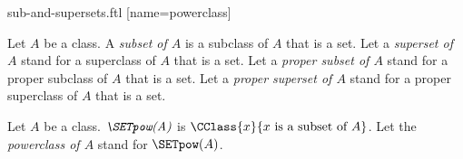\documentclass{stex}
\begin{document}
\begin{smodule}{sub-and-supersets.ftl}
[name=powerclass]{}

\begin{definition}[forthel,for={subset,superset,proper subset,proper superset}]
  Let $A$ be a class.
  A \emph{subset of $A$} is a subclass of $A$ that is a set.
  Let a \emph{superset of $A$} stand for a superclass of $A$ that is a set.
  Let a \emph{proper subset of $A$} stand for a proper subclass of $A$ that is a set.
  Let a \emph{proper superset of $A$} stand for a proper superclass of $A$ that is a set.
\end{definition}

\begin{definition}[forthel,for=powerclass]
  Let $A$ be a class.
  $\emph{\SETpow(A)}$ is $\CClass{x}{x\text{ is a subset of }A}$.
  Let the \emph{powerclass of $A$} stand for $\SETpow(A)$.
\end{definition}
\end{smodule}
\end{document}
